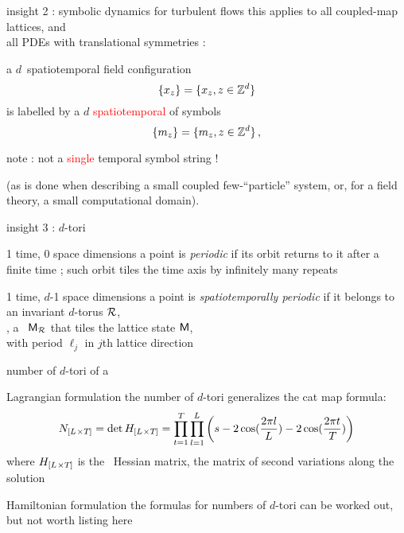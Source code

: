 \begin{frame}{insight 2 : symbolic dynamics for turbulent flows}
this applies to
all coupled-map lattices, and \\
all PDEs with translational symmetries :

\bigskip

a $d$\dmn\ spatiotemporal field configuration
\[
\{x_{z}\} = \{x_{z},  z\in \mathbb{Z}^{d}  \}
\]
is labelled by a {\em $d$\dmn} \textcolor{red}{spatiotemporal {\brick}} of symbols
\[
\{m_{z}\} = \{m_{z}, z\in \mathbb{Z}^{d}\}
\,,
\]

\medskip

\begin{center}
  note : {\Large not} a \textcolor{red}{single} temporal symbol string !
\end{center}

\bigskip

(as is done when describing a small coupled few-``particle'' system, or, for
a field theory, a
small computational domain).
\end{frame}

\begin{frame}{insight 3 : $d$-tori } %
\begin{block}{1 time, 0 space dimensions}
a {\statesp} point is {\em periodic} if its orbit returns to it
after a finite time \period{}; such orbit tiles the time axis
by infinitely many repeats
\end{block}

\bigskip

\begin{block}{1 time, $d$-1 space dimensions}
 a {\statesp} point is {\em spatiotemporally periodic} if
it belongs to \\ an invariant $d$-torus ${\mathcal{R}}$,\\
\ie, a \brick\ $\mathsf{M}_{\mathcal{R}}$ that
tiles the lattice state  $\mathsf{M}$, \\
with period $\ell_j$ in $j$th lattice direction
\end{block}
\end{frame}

\begin{frame}{number of $d$-tori of a \catlatt}
\begin{block}{Lagrangian formulation}
the number of $d$-tori generalizes the cat map formula:
\[
N_{[{L_{}}\times{\ensuremath{T_{}}}]} = \mathrm{det}\, H_{[{L_{}}\times{\ensuremath{T_{}}}]}
= \prod_{t=1}^{{T_{}}}\prod_{l=1}^{L_{}}
\left(
s-2\cos(\frac{2\pi l}{{L_{}}})-2\cos(\frac{2\pi t}{{T_{}}})
\right)
\]
where  $H_{[{L_{}}\times{\ensuremath{T_{}}}]}$ is the \twot\ Hessian matrix,
the matrix of second variations
along the solution
\end{block}
\bigskip
\begin{block}{Hamiltonian formulation}
the formulas for numbers of $d$-tori can be worked out, but
not worth listing here
\end{block}
\end{frame}

